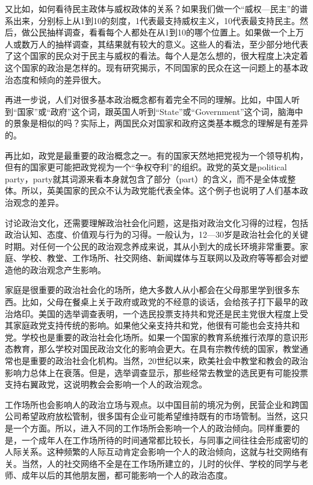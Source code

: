 又比如，如何看待民主政体与威权政体的关系？如果我们做一个“威权—民主”的谱系出来，分别标上从1到10的刻度，1代表最支持威权主义，10代表最支持民主。然后，做公民抽样调查，看看每个人都处在从1到10的哪个位置上。如果做一个上万人或数万人的抽样调查，其结果就有较大的意义。这些人的看法，至少部分地代表了这个国家的民众对于民主与威权的看法。每个人是怎么想的，很大程度上决定着这个国家的政治是怎样的。现有研究揭示，不同国家的民众在这一问题上的基本政治态度和倾向的差异很大。

再进一步说，人们对很多基本政治概念都有着完全不同的理解。比如，中国人听到“国家”或“政府”这个词，跟英国人听到“State”或“Government”这个词，脑海中的景象是相似的吗？实际上，两国民众对国家和政府这类基本概念的理解是有差异的。

再比如，政党是最重要的政治概念之一。有的国家天然地把党视为一个领导机构，但有的国家更可能把政党视为一个“争权夺利”的组织。政党的英文是political party，party就其词源来看本身就包含了部分（part）的含义，而不是全体或整体。所以，英美国家的民众不认为政党能代表全体。这个例子也说明了人们基本政治观念的差异。

讨论政治文化，还需要理解政治社会化问题，这是指对政治文化习得的过程，包括政治认知、态度、价值观与行为的习得。一般认为，12—30岁是政治社会化的关键时期。对任何一个公民的政治观念养成来说，其从小到大的成长环境非常重要。家庭、学校、教堂、工作场所、社交网络、新闻媒体与互联网以及政府等等都会对塑造他的政治观念产生影响。

家庭是很重要的政治社会化的场所，绝大多数人从小都会在父母那里学到很多东西。比如，父母在餐桌上关于政府或政党的不经意的谈话，会给孩子打下最早的政治烙印。美国的选举调查表明，一个选民投票支持共和党还是民主党很大程度上受其家庭政党支持传统的影响。如果他父亲支持共和党，他很有可能也会支持共和党。学校也是重要的政治社会化场所。如果一个国家的教育系统推行浓厚的意识形态教育，那么学校对国民政治文化的影响会更大。在具有宗教传统的国家，教堂通常也是重要的政治社会化机构。当然，20世纪以来，欧美社会中教堂和教会的政治影响力总体上在衰落。但是，选举调查显示，那些经常去教堂的选民更有可能投票支持右翼政党，这说明教会会影响一个人的政治观念。

工作场所也会影响人的政治立场与观点。以中国目前的境况为例，民营企业和跨国公司希望政府放松管制，很多国有企业可能希望维持既有的市场管制。当然，这只是一个方面。所以，进入不同的工作场所会影响一个人的政治倾向。同样重要的是，一个成年人在工作场所待的时间通常都比较长，与同事之间往往会形成密切的人际关系。这种频繁的人际互动肯定会影响一个人的政治倾向，这就与社交网络有关。当然，人的社交网络不全是在工作场所建立的，儿时的伙伴、学校的同学与老师、成年以后的其他朋友圈，都可能影响一个人的政治态度。

